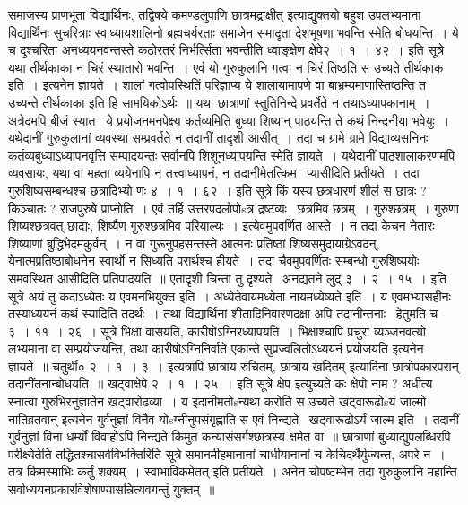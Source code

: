 \documentclass[11pt, openany]{book}
\begin{document}
समाजस्य प्राणभूता विद्यार्थिनः, तद्विषये {\qt कमण्डलुपाणि छात्रमद्राक्षीत्} इत्याद्युक्तयो बहुश उपलभ्यमाना विद्यार्थिनः सुचरित्राः स्वाध्यायशालिनो ब्रह्मचर्यरताः समाजेन समादृता देशभूषणा भवन्ति स्मेति बोधयन्ति~। ये च दुश्चरिता अनध्ययनवन्तस्ते कठोरतरं निर्भर्त्सिता भवन्तीति ध्वाङ्क्षेण क्षेपे२~। १~। ४२~। इति सूत्रे {\qt यथा तीर्थकाका न चिरं स्थातारो भवन्ति~। एवं यो गुरुकुलानि गत्वा न चिरं तिष्ठति स उच्यते तीर्थकाक इति~।} इत्यनेन ज्ञायते~। शालां गत्वोपस्थितिं परिज्ञाप्य ये शालायामापणे वा बाभ्रम्यमाणास्तिष्ठन्ति त उच्यन्ते तीर्थकाका इति हि सामयिकोऽर्थः~॥ यथा छात्राणां स्तुतिनिन्दे प्रवर्तेते न तथाऽध्यापकानाम्~। अत्रेदमपि बीजं स्यात \textendash\ ये प्रयोजनमनपेक्ष्य कर्तव्यमिति बुध्या शिष्यान् पाठयन्ति ते कथं निन्दनीया भवेयुः~। यथेदानीं गुरुकुलानां व्यवस्था सम्प्रवर्तते न तदानीं तादृशी आसीत्~। तदा च ग्रामे ग्रामे विद्याव्यसनिनः कर्तव्यबुध्याऽध्यापनवृत्ति सम्पादयन्तः सर्वानपि शिशूनध्यापयन्ति स्मेति ज्ञायते~। यथेदानीं पाठशालाकरणमपि व्यवसायः, यथा वा महता व्ययेनापि न तत्त्वाध्यापनं, न तदानीमेतत्किम \textendash\ प्यासीदिति प्रतीयते~। तदा गुरुशिष्यसम्बन्धश्च छत्रादिभ्यो णः ४~। १~। ६२~। इति सूत्रे किं यस्य छत्रधारणं शीलं स छात्रः ? किञ्चातः ? राजपुरुषे प्राप्नोति~। एवं तर्हि उत्तरपदलोपोsत्र द्रष्टव्यः \textendash\ छत्रमिव छत्रम्~। गुरुश्छत्रम्~। गुरुणा शिष्यश्छत्रवत् छाद्यः, शिष्यैण गुरुश्छत्रमिव परियाल्यः~। {\qt इत्येवमुपवर्णित आस्ते~।} न तदा केचन नेतारः शिष्याणां बुद्धिभेदमकुर्वन्~। न वा गुरूनुपहसन्तस्ते आत्मनः प्रतिष्ठां शिष्यसमुदायाग्रेऽवदन्, येनात्मप्रतिष्ठाबोधनेन स्वार्थो न सिध्यति परार्थश्च हीयते~। तदा चैवमुपवर्णितः सम्बन्धो गुरुशिष्ययोः समवस्थित आसीदिति प्रतिपादयति~॥ एतादृशी चिन्ता तु दृश्यते \textendash\ अनद्यतने लुद् ३~। २~। १५~। इति सूत्रे {\qt अयं तु कदाऽध्येतः य एवमनभियुक्त इति~। अध्येतेवायमध्येता नायमध्येष्यते} इति~। य एवमभ्यासहीनः तस्याध्ययनं कथं स्यादिति तदर्थः~। तथा विद्यार्थिनां शीतादिनिवारणदक्षा अपि तदानीन्तनाः \textendash\ हेतुमति च ३~। ११~। २६~। सूत्रे {\qt भिक्षा वासयति, कारीषोऽग्निरध्यापयति~। भिक्षाश्चापि प्रचुरा व्यञ्जनवत्यो लभ्यमाना वा सम्प्रयोजयन्ति, तथा कारीषोऽग्निनिर्वाते एकान्ते सुप्रज्वलितोऽध्ययनं प्रयोजयति} इत्यनेन ज्ञायते~॥ चतुर्थी० २~। १~। ३~। इत्यत्रापि {\qt छात्राय रुचितम्, छात्राय खदितम्} इत्यादिना छात्रोपकारपरान् तदानींतनान्बोधयति~॥ खट्वाक्षेपे २~। १~। २५~। इति सूत्रे {\qt क्षेप इत्युच्यते कः क्षेपो नाम ? अधीत्य स्नात्वा गुरुभिरनुज्ञातेन खट्वारोढव्या~। य इदानीमतोsन्यथा करोति स उच्यते खट्वारूढोsयं जाल्मो नातिव्रतवान्} इत्यनेन गुर्वनुज्ञां विनैव योsग्नीनुपसंगृह्णाति स एवं निन्द्यते \textendash\ खट्वारूढोऽर्यं जाल्म इति~। तदानीं गुर्वनुज्ञां विना धर्म्यों विवाहोऽपि निन्द्यते किमुत कन्यासंसर्गश्छात्रस्य क्षमेत वा~॥ छात्राणां बुध्याद्युपलब्धिरपि परीक्ष्येतेति तद्धितश्चासर्वविभक्तिरिति सूत्रे {\qt समानमीहमानानां चाधीयानानां च केचिदर्थैर्युज्यन्त, अपरे न~। तत्र किमस्माभिः कर्तुं शक्यम्~। स्वाभाविकमेतत्} इति प्रतीयते~। अनेन चोपष्टम्भेन तदा गुरुकुलानि महान्ति सर्वाध्ययनप्रकारविशेषाण्यासन्नित्यवगन्तुं युक्तम्~॥\\
\end{document}
